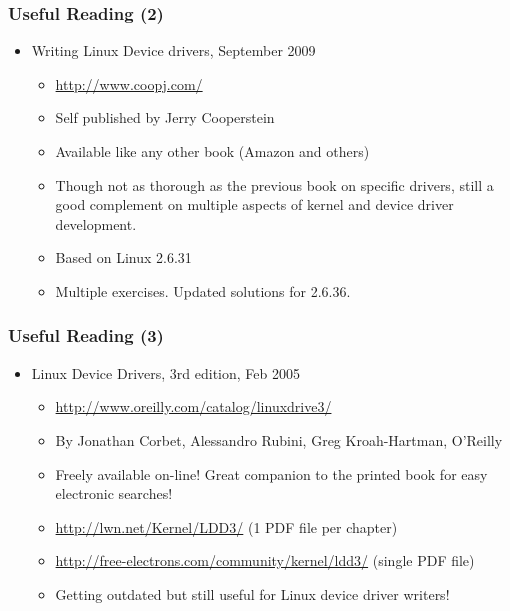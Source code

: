 \begin{frame}
  \frametitle{Useful Reading (2)}
  \begin{itemize}
  \item Writing Linux Device drivers, September 2009
    \begin{itemize}
    \item \url{http://www.coopj.com/}
    \item Self published by Jerry Cooperstein
    \item Available like any other book (Amazon and others)
    \item Though not as thorough as the previous book on specific
      drivers, still a good complement on multiple aspects of kernel
      and device driver development.
    \item Based on Linux 2.6.31
    \item Multiple exercises. Updated solutions for 2.6.36.
    \end{itemize}
  \end{itemize}
\end{frame}

\begin{frame}
  \frametitle{Useful Reading (3)}
  \begin{itemize}
  \item Linux Device Drivers, 3rd edition, Feb 2005
    \begin{itemize}
    \item \url{http://www.oreilly.com/catalog/linuxdrive3/}
    \item By Jonathan Corbet, Alessandro Rubini, Greg Kroah-Hartman,
      O'Reilly
    \item Freely available on-line! Great companion to the printed
      book for easy electronic searches!
    \item \url{http://lwn.net/Kernel/LDD3/} (1 PDF file per chapter)
    \item \url{http://free-electrons.com/community/kernel/ldd3/}
      (single PDF file)
    \item Getting outdated but still useful for Linux device driver
      writers!
    \end{itemize}
  \end{itemize}
\end{frame}

